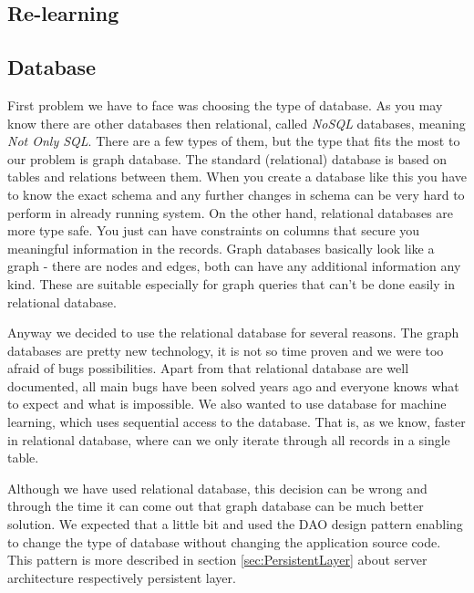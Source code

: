 \subsection{Re-learning}


\subsection{Database}


First problem we have to face was choosing the type of database. As you may know there are other databases then relational, called \emph{NoSQL} databases, meaning \emph{Not Only SQL}. There are a few types of them, but the type that fits the most to our problem is graph database. The standard (relational) database is based on tables and relations between them. When you create a database like this you have to know the exact schema and any further changes in schema can be very hard to perform in already running system. On the other hand, relational databases are more type safe. You just can have constraints on columns that secure you meaningful information in the records. Graph databases basically look like a graph - there are nodes and edges, both can have any additional information any kind. These are suitable especially for graph queries that can't be done easily in relational database.

Anyway we decided to use the relational database for several reasons.
The graph databases are pretty new technology, it is not so time proven and we were too afraid of bugs possibilities. Apart from that relational database are well documented, all main bugs have been solved years ago and everyone knows what to expect and what is impossible.
We also wanted to use database for machine learning, which uses sequential access to the database. That is, as we know, faster in relational database, where can we only iterate through all records in a single table.

Although we have used relational database, this decision can be wrong and through the time it can come out that graph database can be much better solution. We expected that a little bit and used the DAO design pattern enabling to change the type of database without changing the application source code. This pattern is more described in section \ref{sec:PersistentLayer} about server architecture respectively persistent layer.

